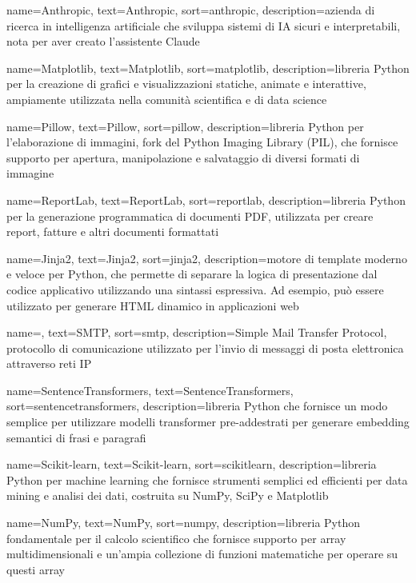  {
    name=Anthropic,
    text=Anthropic,
    sort=anthropic,
    description={azienda di ricerca in intelligenza artificiale che sviluppa sistemi di IA sicuri e interpretabili, nota per aver creato l'assistente Claude}
}

 {
    name=Matplotlib,
    text=Matplotlib,
    sort=matplotlib,
    description={libreria Python per la creazione di grafici e visualizzazioni statiche, animate e interattive, ampiamente utilizzata nella comunità scientifica e di data science}
}

 {
    name=Pillow,
    text=Pillow,
    sort=pillow,
    description={libreria Python per l'elaborazione di immagini, fork del Python Imaging Library (PIL), che fornisce supporto per apertura, manipolazione e salvataggio di diversi formati di immagine}
}

 {
    name=ReportLab,
    text=ReportLab,
    sort=reportlab,
    description={libreria Python per la generazione programmatica di documenti PDF, utilizzata per creare report, fatture e altri documenti formattati}
}

 {
    name=Jinja2,
    text=Jinja2,
    sort=jinja2,
    description={motore di template moderno e veloce per Python, che permette di separare la logica di presentazione dal codice applicativo utilizzando una sintassi espressiva. Ad esempio, può essere utilizzato per generare HTML dinamico in applicazioni web}
}

 {
    name=,
    text=SMTP,
    sort=smtp,
    description={Simple Mail Transfer Protocol, protocollo di comunicazione utilizzato per l'invio di messaggi di posta elettronica attraverso reti IP}
}

 {
    name=SentenceTransformers,
    text=SentenceTransformers,
    sort=sentencetransformers,
    description={libreria Python che fornisce un modo semplice per utilizzare modelli transformer pre-addestrati per generare embedding semantici di frasi e paragrafi}
}

 {
    name=Scikit-learn,
    text=Scikit-learn,
    sort=scikitlearn,
    description={libreria Python per machine learning che fornisce strumenti semplici ed efficienti per data mining e analisi dei dati, costruita su NumPy, SciPy e Matplotlib}
}

 {
    name=NumPy,
    text=NumPy,
    sort=numpy,
    description={libreria Python fondamentale per il calcolo scientifico che fornisce supporto per array multidimensionali e un'ampia collezione di funzioni matematiche per operare su questi array}
}

